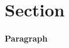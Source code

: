 \documentclass[../main.tex]{subfiles}
\begin{document}
\section{Section}
\barh 

\paragraph{Paragraph}
\end{document}

